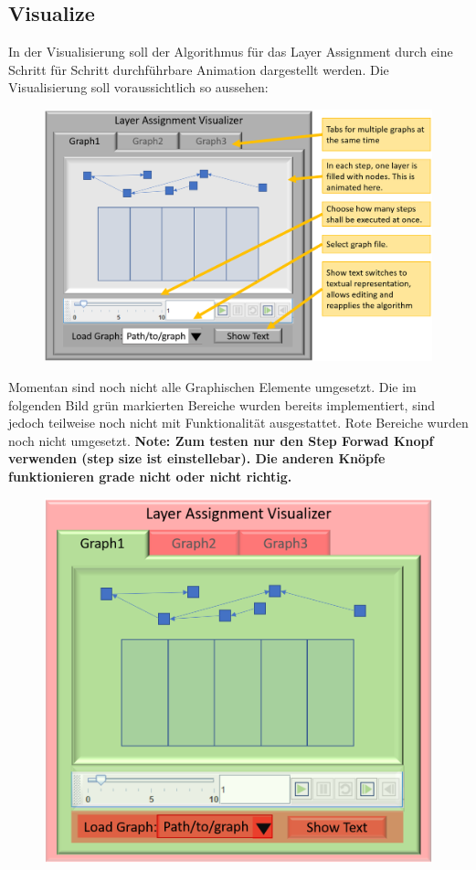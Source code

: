


\subsection*{Visualize}


In der Visualisierung soll der Algorithmus für das Layer Assignment durch eine Schritt für Schritt durchführbare Animation dargestellt werden. Die Visualisierung soll voraussichtlich so aussehen:

\begin{figure}[h!]
    \centering
   \includegraphics[width=.7\textwidth ]{images/mockupInfo.png}
\end{figure}

Momentan sind noch nicht alle Graphischen Elemente umgesetzt. Die im folgenden Bild grün markierten Bereiche wurden bereits implementiert, sind jedoch teilweise noch nicht mit Funktionalität ausgestattet. Rote Bereiche wurden noch nicht umgesetzt. 
\textbf{Note: Zum testen nur den Step Forwad Knopf verwenden (step size ist einstellebar). Die anderen Knöpfe funktionieren grade nicht oder nicht richtig.}

\begin{figure}[h!]
    \centering
    \includegraphics[width=\textwidth / 2]{images/mockupRedGreen.png}
\end{figure}